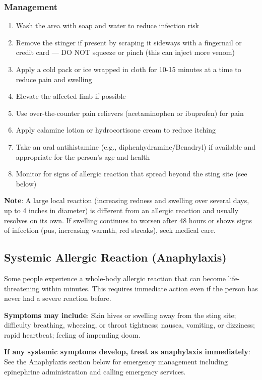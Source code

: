 \subsubsection{Management}

\begin{enumerate}[leftmargin=*]
  \item Wash the area with soap and water to reduce infection risk
  \item Remove the stinger if present by scraping it sideways with a fingernail or credit card — DO NOT squeeze or pinch (this can inject more venom)
  \item Apply a cold pack or ice wrapped in cloth for 10-15 minutes at a time to reduce pain and swelling
  \item Elevate the affected limb if possible
  \item Use over-the-counter pain relievers (acetaminophen or ibuprofen) for pain
  \item Apply calamine lotion or hydrocortisone cream to reduce itching
  \item Take an oral antihistamine (e.g., diphenhydramine/Benadryl) if available and appropriate for the person's age and health
  \item Monitor for signs of allergic reaction that spread beyond the sting site (see below)
\end{enumerate}
\noindent\textbf{Note}: A large local reaction (increasing redness and swelling over several days, up to 4 inches in diameter) is different from an allergic reaction and usually resolves on its own. If swelling continues to worsen after 48 hours or shows signs of infection (pus, increasing warmth, red streaks), seek medical care.

\subsection{Systemic Allergic Reaction (Anaphylaxis)}

Some people experience a whole-body allergic reaction that can become life-threatening within minutes. This requires immediate action even if the person has never had a severe reaction before.

\textbf{Symptoms may include}: Skin hives or swelling away from the sting site; difficulty breathing, wheezing, or throat tightness; nausea, vomiting, or dizziness; rapid heartbeat; feeling of impending doom.

\textbf{If any systemic symptoms develop, treat as anaphylaxis immediately}: See the Anaphylaxis section below for emergency management including epinephrine administration and calling emergency services.


